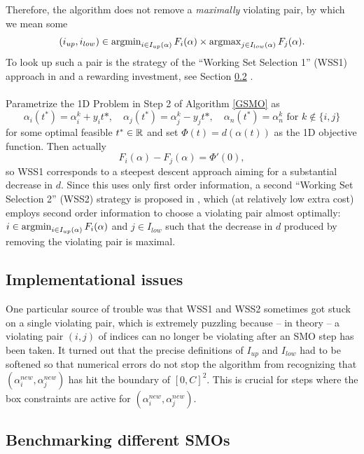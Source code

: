 Therefore, the algorithm does not remove a \textit{maximally} violating pair, by which we mean some 
\[
(i_{up},i_{low}) \in \operatorname{argmin}_{i \in I_{up}(\alpha)}F_i(\alpha) \times \operatorname{argmax}_{j \in I_{low}(\alpha)}F_j(\alpha).
\] To look up such a pair is the strategy of the ``Working Set Selection 1'' (WSS1) approach in \cite{FanChenLin} and a rewarding investment, see Section \ref{sec:benchmark} . \\\\
Parametrize the 1D Problem in Step 2 of Algorithm \ref{GSMO} as
\[
\alpha_i(t^*) = \alpha^k_i + y_i t*, \quad \alpha_j(t^*) = \alpha^k_j - y_j t*, \quad \alpha_n(t^*) = \alpha^k_n \text{ for } k \notin \{i,j\}
\]
for some optimal feasible $t^* \in \mathbb{R}$ and set $\Phi(t) = d(\alpha(t))$ as the 1D objective function. Then actually
\begin{equation*}
F_i(\alpha) - F_j(\alpha) = \Phi'(0),
\end{equation*}
so WSS1 corresponds to a steepest descent approach aiming for a substantial decrease in $d$. Since this uses only first order information, a second ``Working Set Selection 2'' (WSS2) strategy is proposed in \cite{FanChenLin}, which (at relatively low extra cost) employs second order information to choose a violating pair almost optimally: $i \in \operatorname{argmin}_{i \in I_{up}(\alpha)}F_i(\alpha)$ and $j \in I_{low}$ such that the decrease in $d$ produced by removing the violating pair is maximal.

\subsection{Implementational issues}
One particular source of trouble was that WSS1 and WSS2 sometimes got stuck on a single violating pair, which is extremely puzzling because -- in theory -- a violating pair $(i,j)$ of indices can no longer be violating after an SMO step has been taken. It turned out that the precise definitions of $I_{up}$ and $I_{low}$ had to be softened so that numerical errors do not stop the algorithm from recognizing that $(\alpha^{new}_i,\alpha^{new}_j)$ has hit the boundary of $[0,C]^2$. This is crucial for steps where the box constraints are active for $(\alpha^{new}_i,\alpha^{new}_j)$.

\subsection{Benchmarking different SMOs} \label{sec:benchmark}

